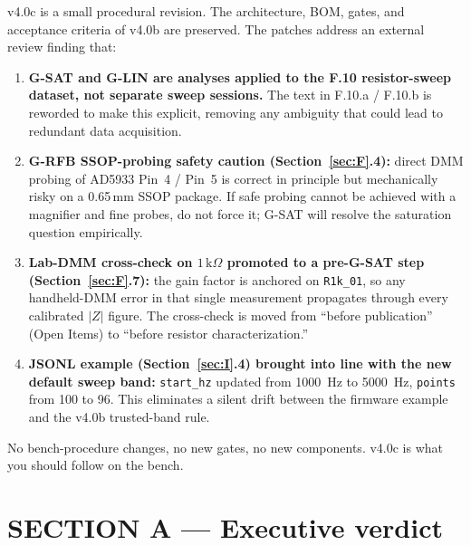 \documentclass[11pt,a4paper]{article}
\newcommand{\kohm}[1]{\ensuremath{#1\,\mathrm{k}\Omega}}
\begin{document}
\begin{tcolorbox}[enhanced, colback=EISIce, colframe=EISNavy, boxrule=0.8pt, arc=2mm,
  left=2mm,right=2mm,top=1.5mm,bottom=1.5mm,
  title=\textbf{v4.0c Procedural Patch Summary (changes since v4.0b)},
  coltitle=white, colbacktitle=EISNavy]
v4.0c is a small procedural revision. The architecture, BOM, gates, and acceptance criteria of v4.0b are preserved. The patches address an external review finding that:
\begin{enumerate}[topsep=2pt,itemsep=1pt,leftmargin=1.4em]
\item \textbf{G-SAT and G-LIN are analyses applied to the F.10 resistor-sweep dataset, not separate sweep sessions.} The text in F.10.a / F.10.b is reworded to make this explicit, removing any ambiguity that could lead to redundant data acquisition.
\item \textbf{G-RFB SSOP-probing safety caution (Section~\ref{sec:F}.4):} direct DMM probing of AD5933 Pin~4 / Pin~5 is correct in principle but mechanically risky on a 0.65\,mm SSOP package. If safe probing cannot be achieved with a magnifier and fine probes, do not force it; G-SAT will resolve the saturation question empirically.
\item \textbf{Lab-DMM cross-check on \kohm{1} promoted to a pre-G-SAT step (Section~\ref{sec:F}.7):} the gain factor is anchored on \texttt{R1k\_01}, so any handheld-DMM error in that single measurement propagates through every calibrated $|Z|$ figure. The cross-check is moved from ``before publication'' (Open Items) to ``before resistor characterization.''
\item \textbf{JSONL example (Section~\ref{sec:I}.4) brought into line with the new default sweep band:} \texttt{start\_hz} updated from \SI{1000}{\hertz} to \SI{5000}{\hertz}, \texttt{points} from 100 to 96. This eliminates a silent drift between the firmware example and the v4.0b trusted-band rule.
\end{enumerate}
No bench-procedure changes, no new gates, no new components. v4.0c is what you should follow on the bench.
\end{tcolorbox}

\tableofcontents
\newpage

\section{SECTION A --- Executive verdict}
\label{sec:A}
\end{document}
